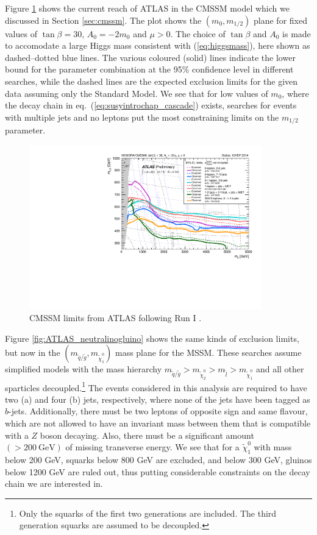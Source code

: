 \documentclass[twoside,english]{uiofysmaster}
\begin{document}
Figure \ref{fig:ATLAS_mSUGRA} shows the current reach of ATLAS in the CMSSM model which we discussed in Section \ref{sec:cmssm}. The plot shows the $(m_0,m_{1/2})$ plane for fixed values of $\tan\beta = 30$, $A_0 = -2m_0$ and $\mu>0$. The choice of $\tan\beta$ and $A_0$ is made to accomodate a large Higgs mass consistent with (\ref{eq:higgsmass}), here shown as dashed--dotted blue lines. The various coloured (solid) lines indicate the lower bound for the parameter combination at the 95\% confidence level in different searches, while the dashed lines are the expected exclusion limits for the given data assuming only the Standard Model. We see that for low values of $m_0$, where the decay chain in eq.~(\ref{eq:susyintrochap_cascade}) exists, searches for events with multiple jets and no leptons put the most constraining limits on the $m_{1/2}$ parameter.
\begin{figure}[hbt]
	\centering
	\includegraphics[width=0.9\textwidth]{figures/susyintro/ATLAS_SUSY_MSUGRA.pdf}
	\caption{CMSSM limits from ATLAS following Run I \cite{Aad:2014wea,Aad:2013wta,Aad:2014lra,Aad:2015mia,Aad:2014mra,Aad:2014pda}.}
	\label{fig:ATLAS_mSUGRA}
\end{figure}

Figure \ref{fig:ATLAS_neutralinogluino} shows the same kinds of exclusion limits, but now in the $(m_{\tilde q/\tilde g}, m_{\tilde \chi_1^0})$ mass plane for the MSSM. These searches assume simplified models with the mass hierarchy $m_{\tilde q/\tilde g} > m_{\tilde \chi_2^0} > m_{\tilde l} > m_{\tilde \chi_1^0}$ and all other sparticles decoupled.\footnote{Only the squarks of the first two generations are included. The third generation squarks are assumed to be decoupled.} The events considered in this analysis are required to have two (a) and four (b) jets, respectively, where none of the jets have been tagged as $b$-jets. Additionally, there must be two leptons of opposite sign and same flavour, which are not allowed to have an invariant mass between them that is compatible with a $Z$ boson decaying. Also, there must be a significant amount $(> 200 ~\mathrm{GeV})$ of missing transverse energy. We see that for a $\tilde \chi_1^0$ with mass below 200 GeV, squarks below 800 GeV are excluded, and below 300 GeV, gluinos below 1200 GeV are ruled out, thus putting considerable constraints on the decay chain we are interested in.
\end{document}
